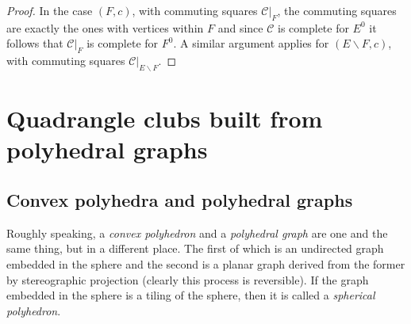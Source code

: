 \documentclass[12pt]{amsart}
\theoremstyle{definition}
\theoremstyle{remark}
\numberwithin{equation}{section}
\newcommand{\Cc}{\mathcal{C}}
\begin{document}
\begin{proof}
In the case $(F, c)$, with commuting squares $\Cc |_{F}$,  the commuting squares are exactly the ones with vertices within $F$ and since $\Cc$ is complete for $E^0$ it follows that $ \Cc |_{F}$ is complete for $F^0$. A similar argument applies for $(E \backslash F, c)$, with commuting squares $\Cc |_{E \backslash F}$.
\end{proof}

\section{Quadrangle clubs built from polyhedral graphs} \label{sec:two}

\subsection{Convex polyhedra and polyhedral graphs} 

Roughly speaking, a \emph{convex polyhedron} and a \emph{polyhedral graph} are one and the same thing, but in a different place. The first of which is an undirected graph embedded in the sphere and the second is a planar graph derived  from the former by stereographic projection (clearly this process is reversible). If the graph embedded in the sphere is a tiling of the sphere, then it is called a \emph{spherical polyhedron}.
\end{document}
